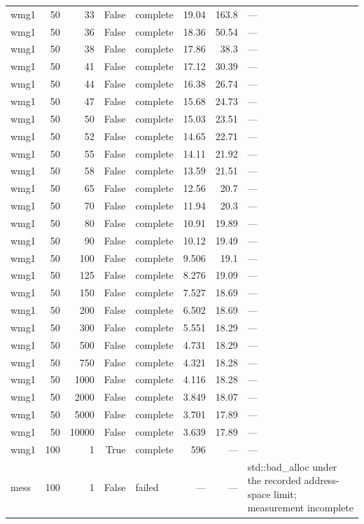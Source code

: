 \begin{tabular}{lrrrlrrl}
wmg1 & 50 & 33 & False & complete & 19.04 & 163.8 & — \\
wmg1 & 50 & 36 & False & complete & 18.36 & 50.54 & — \\
wmg1 & 50 & 38 & False & complete & 17.86 & 38.3 & — \\
wmg1 & 50 & 41 & False & complete & 17.12 & 30.39 & — \\
wmg1 & 50 & 44 & False & complete & 16.38 & 26.74 & — \\
wmg1 & 50 & 47 & False & complete & 15.68 & 24.73 & — \\
wmg1 & 50 & 50 & False & complete & 15.03 & 23.51 & — \\
wmg1 & 50 & 52 & False & complete & 14.65 & 22.71 & — \\
wmg1 & 50 & 55 & False & complete & 14.11 & 21.92 & — \\
wmg1 & 50 & 58 & False & complete & 13.59 & 21.51 & — \\
wmg1 & 50 & 65 & False & complete & 12.56 & 20.7 & — \\
wmg1 & 50 & 70 & False & complete & 11.94 & 20.3 & — \\
wmg1 & 50 & 80 & False & complete & 10.91 & 19.89 & — \\
wmg1 & 50 & 90 & False & complete & 10.12 & 19.49 & — \\
wmg1 & 50 & 100 & False & complete & 9.506 & 19.1 & — \\
wmg1 & 50 & 125 & False & complete & 8.276 & 19.09 & — \\
wmg1 & 50 & 150 & False & complete & 7.527 & 18.69 & — \\
wmg1 & 50 & 200 & False & complete & 6.502 & 18.69 & — \\
wmg1 & 50 & 300 & False & complete & 5.551 & 18.29 & — \\
wmg1 & 50 & 500 & False & complete & 4.731 & 18.29 & — \\
wmg1 & 50 & 750 & False & complete & 4.321 & 18.28 & — \\
wmg1 & 50 & 1000 & False & complete & 4.116 & 18.28 & — \\
wmg1 & 50 & 2000 & False & complete & 3.849 & 18.07 & — \\
wmg1 & 50 & 5000 & False & complete & 3.701 & 17.89 & — \\
wmg1 & 50 & 10000 & False & complete & 3.639 & 17.89 & — \\
wmg1 & 100 & 1 & True & complete & 596 & — & — \\
mess & 100 & 1 & False & failed & — & — & std::bad\_alloc under the recorded address-space limit; measurement incomplete \\

\end{tabular}
